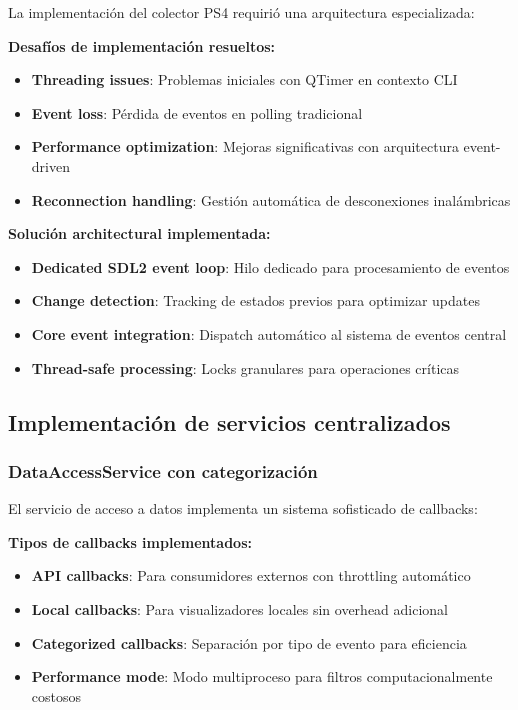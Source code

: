 La implementación del colector PS4 requirió una arquitectura especializada:

\textbf{Desafíos de implementación resueltos:}
\begin{itemize}
    \item \textbf{Threading issues}: Problemas iniciales con QTimer en contexto CLI
    \item \textbf{Event loss}: Pérdida de eventos en polling tradicional
    \item \textbf{Performance optimization}: Mejoras significativas con arquitectura event-driven
    \item \textbf{Reconnection handling}: Gestión automática de desconexiones inalámbricas
\end{itemize}

\textbf{Solución architectural implementada:}
\begin{itemize}
    \item \textbf{Dedicated SDL2 event loop}: Hilo dedicado para procesamiento de eventos
    \item \textbf{Change detection}: Tracking de estados previos para optimizar updates
    \item \textbf{Core event integration}: Dispatch automático al sistema de eventos central
    \item \textbf{Thread-safe processing}: Locks granulares para operaciones críticas
\end{itemize}

\subsection{Implementación de servicios centralizados}
\label{subsec:servicios_centralizados_input}

\subsubsection{DataAccessService con categorización}

El servicio de acceso a datos implementa un sistema sofisticado de callbacks:

\textbf{Tipos de callbacks implementados:}
\begin{itemize}
    \item \textbf{API callbacks}: Para consumidores externos con throttling automático
    \item \textbf{Local callbacks}: Para visualizadores locales sin overhead adicional
    \item \textbf{Categorized callbacks}: Separación por tipo de evento para eficiencia
    \item \textbf{Performance mode}: Modo multiproceso para filtros computacionalmente costosos
\end{itemize}

